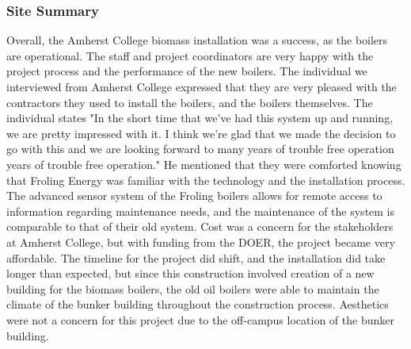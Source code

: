 \subsubsection{Site Summary}
\par Overall, the Amherst College biomass installation was a success, as the boilers are operational. The staff and project coordinators are very happy with the project process and the performance of the new boilers. The individual we interviewed from Amherst College expressed that they are very pleased with the contractors they used to install the boilers, and the boilers themselves. The individual states "In the short time that we’ve had this system up and running, we are pretty impressed with it. I think we’re glad that we made the decision to go with this and we are looking forward to many years of trouble free operation years of trouble free operation." He mentioned that they were comforted knowing that Froling Energy was familiar with the technology and the installation process. The advanced sensor system of the Froling boilers allows for remote access to information regarding maintenance needs, and the maintenance of the system is comparable to that of their old system. Cost was a concern for the stakeholders at Amherst College, but with funding from the DOER, the project became very affordable. The timeline for the project did shift, and the installation did take longer than expected, but since this construction involved creation of a new building for the biomass boilers, the old oil boilers were able to maintain the climate of the bunker building throughout the construction process. Aesthetics were not a concern for this project due to the off-campus location of the bunker building.


